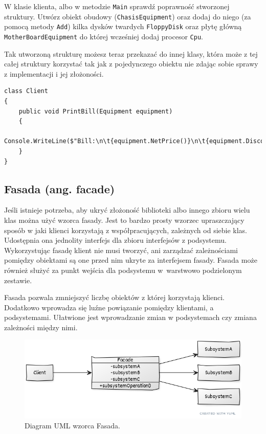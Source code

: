 W klasie klienta, albo w metodzie \texttt{Main} sprawdź poprawność stworzonej struktury. Utwórz obiekt obudowy (\texttt{ChasisEquipment}) oraz dodaj do niego (za pomocą metody \texttt{Add}) kilka dysków twardych \texttt{FloppyDisk} oraz płytę główną \texttt{MotherBoardEquipment} do której wcześniej dodaj procesor \texttt{Cpu}.

Tak utworzoną strukturę możesz teraz przekazać do innej klasy, która może z tej całej struktury korzystać tak jak z pojedynczego obiektu nie zdając sobie sprawy z implementacji i jej złożoności.
\begin{lstlisting}
class Client
{
	public void PrintBill(Equipment equipment)
	{
		Console.WriteLine($"Bill:\n\t{equipment.NetPrice()}\n\t{equipment.DiscountPrice()}\n\t{equipment.Power()}");
	}
}
\end{lstlisting}

\subsection{Fasada (ang. facade)}
Jeśli istnieje potrzeba, aby ukryć złożoność biblioteki albo innego zbioru wielu klas można użyć wzorca fasady. Jest to bardzo prosty wzorzec upraszczający sposób w jaki klienci korzystają z współpracujących, zależnych od siebie klas. Udostępnia ona jednolity interfejs dla zbioru interfejsów z podsystemu. Wykorzystując fasadę klient nie musi tworzyć, ani zarządzać zależnościami pomiędzy obiektami są one przed nim ukryte za interfejsem fasady. Fasada może również służyć za punkt wejścia dla podsystemu w~warstwowo podzielonym zestawie.

Fasada pozwala zmniejszyć liczbę obiektów z której korzystają klienci. Dodatkowo wprowadza się luźne powiązanie pomiędzy klientami, a podsystemami. Ułatwione jest wprowadzanie zmian w podsystemach czy zmiana zależności między nimi. 

\begin{figure}[hbt!]
	\centering
	\includegraphics[width=0.8\linewidth]{images/FacadeUml}
	\caption{Diagram UML wzorca Fasada.}
	\label{lab3/fig/FacadeUml}
\end{figure}
%

